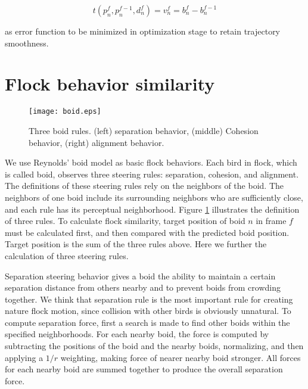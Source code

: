 \begin{equation}\label{eq:4}
 t(p_n^f, p_n^{f-1},d_n^f) = v_n^f = b_n^f-b_n^{f-1}
\end{equation}

as error function to be minimized in optimization stage to retain trajectory smoothness.



\section{Flock behavior similarity}


\begin{figure}[h]
 \begin{center}
  \texttt{[image: boid.eps]}
 \end{center}
 \caption{Three boid rules. (left) separation behavior, (middle) Cohesion behavior, (right) alignment behavior.}
 \label{figure:boid}
\end{figure}


We use Reynolds' boid model as basic flock behaviors. Each bird in flock, which is called boid, observes three steering rules: separation, cohesion, and alignment. The definitions of these steering rules rely on the neighbors of the boid. The neighbors of one boid include its surrounding neighbors who are sufficiently close, and each rule has its perceptual neighborhood. Figure \ref{figure:boid} illustrates the definition of three rules. To calculate flock similarity, target position of boid $n$ in frame $f$ must be calculated first, and then compared with the predicted boid position. Target position is the sum of the three rules above. Here we further the calculation of three steering rules.


Separation steering behavior gives a boid the ability to maintain a certain separation distance from others nearby and to prevent boids from crowding together. We think that separation rule is the most important rule for creating nature flock motion, since collision with other birds is obviously unnatural. To compute separation force, first a search is made to find other boids within the specified neighborhoods. For each nearby boid, the force is computed by subtracting the positions of the boid and the nearby boids, normalizing, and then applying a $1/r$ weighting, making force of nearer nearby boid stronger. All forces for each nearby boid are summed together to produce the overall separation force.


